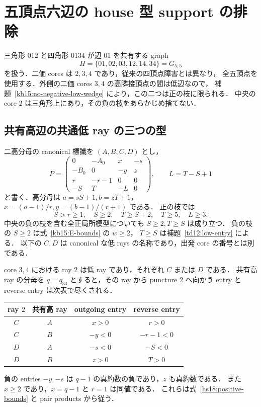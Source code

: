 
\section{五頂点六辺の house 型 support の排除}
\label{hs18:section}

三角形 $012$ と四角形 $0134$ が辺 $01$ を共有する graph
\[
 H=\{01,02,03,12,14,34\}=G_{5,5}
\]
を扱う．二価 cores は $2,3,4$ であり，従来の四頂点障害とは異なり，
全五頂点を使用する．外側の二価 cores $3,4$ の高隣接頂点の間は低辺なので，
補題~\ref{kb15:no-negative-low-wedge} により，この二つは正の枝に限られる．
中央の core $2$ は三角形上にあり，その負の枝をあらかじめ捨てない．

\subsection{共有高辺の共通低 ray の三つの型}

二高分母の canonical 標識を $(A,B,C,D)$ とし，
\[
 P=\begin{pmatrix}
 0&-A_0&x&-s\\
 -B_0&0&-y&z\\
 r&-r-1&0&0\\
 -S&T&-L&0
 \end{pmatrix},\qquad
 L=T-S+1
\]
と書く．高分母は $a=sS+1,b=zT+1$，
$x=(a-1)/r,y=(b-1)/(r+1)$ である．
正の枝では
\begin{equation}\label{hs18:positive-bounds}
 S>r\ge1,\quad S\ge2,\quad T\ge S+2,\quad T\ge5,\quad L\ge3.
\end{equation}
中央の負の枝を含む全正局所模型についても $S\ge2,T\ge S$ は成り立つ．
負の枝の $S\ge2$ は式~\eqref{kb15:E-bounds} の $w\ge2$，
$T\ge S$ は補題~\ref{td12:low-entry} による．
以下の $C,D$ は canonical な低 rays の名称であり，出発 core の番号とは別である．

core $3,4$ における ray $2$ は低 ray であり，それぞれ $C$ または $D$ である．
共有高 ray の分母を $q=q_{34}$ とすると，その ray から puncture $2$ へ向かう
entry と reverse entry は次表で尽くされる．
\begin{center}
\begin{tabular}{cccc}
ray $2$ & 共有高 ray & outgoing entry & reverse entry\\\hline
$C$ & $A$ & $x>0$ & $r>0$\\
$C$ & $B$ & $-y<0$ & $-r-1<0$\\
$D$ & $A$ & $-s<0$ & $-S<0$\\
$D$ & $B$ & $z>0$ & $T>0$
\end{tabular}
\end{center}
負の entries $-y,-s$ は $q-1$ の真約数の負であり，$z$ も真約数である．
また $x\ge2$ であり，$x=q-1$ と $r=1$ は同値である．
これらは式~\eqref{hs18:positive-bounds} と pair products から従う．

